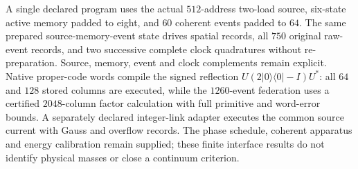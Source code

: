 A single declared program uses the actual $512$-address two-load
source, six-state active memory padded to eight, and $60$ coherent events
padded to $64$. The same prepared source-memory-event state drives spatial
records, all $750$ original raw-event records, and two successive complete
clock quadratures without re-preparation. Source, memory, event and clock
complements remain explicit. Native proper-code words compile the signed
reflection $U(2|0\rangle\langle0|-I)U^*$: all $64$ and $128$ stored columns
are executed, while the $1260$-event federation uses a certified
$2048$-column factor calculation with full primitive and word-error bounds.
A separately declared integer-link adapter executes the common source
current with Gauss and overflow records. The phase schedule, coherent
apparatus and energy calibration remain supplied; these finite interface
results do not identify physical masses or close a continuum criterion.

